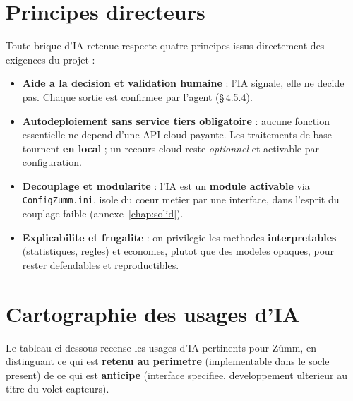 \section{Principes directeurs}
Toute brique d'IA retenue respecte quatre principes issus directement des
exigences du projet :
\begin{itemize}
  \item \textbf{Aide a la decision et validation humaine} : l'IA signale, elle ne
        decide pas. Chaque sortie est confirmee par l'agent (§\,4.5.4).
  \item \textbf{Autodeploiement sans service tiers obligatoire} : aucune
        fonction essentielle ne depend d'une API cloud payante. Les traitements
        de base tournent \textbf{en local} ; un recours cloud reste
        \emph{optionnel} et activable par configuration.
  \item \textbf{Decouplage et modularite} : l'IA est un \textbf{module
        activable} via \texttt{ConfigZumm.ini}, isole du coeur metier par une
        interface, dans l'esprit du couplage faible (annexe~\ref{chap:solid}).
  \item \textbf{Explicabilite et frugalite} : on privilegie les methodes
        \textbf{interpretables} (statistiques, regles) et economes, plutot que
        des modeles opaques, pour rester defendables et reproductibles.
\end{itemize}

\section{Cartographie des usages d'IA}
Le tableau ci-dessous recense les usages d'IA pertinents pour Z\"umm, en
distinguant ce qui est \textbf{retenu au perimetre} (implementable dans le socle
present) de ce qui est \textbf{anticipe} (interface specifiee, developpement
ulterieur au titre du volet capteurs).

